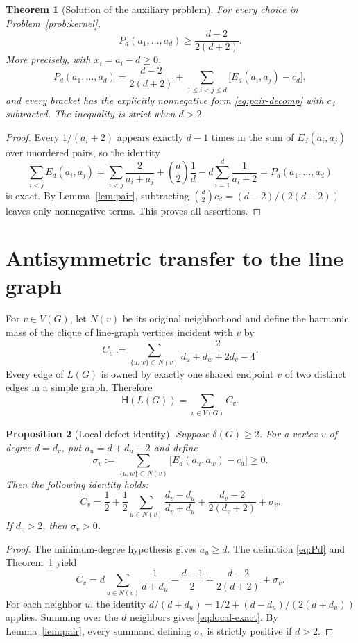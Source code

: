 \documentclass[11pt,a4paper]{article}
\newtheorem{theorem}{Theorem}[section]
\newtheorem{proposition}[theorem]{Proposition}
\theoremstyle{remark}
\newcommand{\HH}{\mathsf H}
\begin{document}
\begin{theorem}[Solution of the auxiliary problem]\label{thm:kernel}
For every choice in Problem~\ref{prob:kernel},
\begin{equation}\label{eq:Pd-bound}
 P_d(a_1,\ldots,a_d)\ge\frac{d-2}{2(d+2)}.
\end{equation}
More precisely, with $x_i=a_i-d\ge0$,
\begin{equation}\label{eq:Pd-exact}
 P_d(a_1,\ldots,a_d)=\frac{d-2}{2(d+2)}
 +\sum_{1\le i<j\le d}\bigl[E_d(a_i,a_j)-c_d\bigr],
\end{equation}
and every bracket has the explicitly nonnegative form \eqref{eq:pair-decomp} with $c_d$ subtracted. The inequality is strict when $d>2$.
\end{theorem}
\begin{proof}
Every $1/(a_i+2)$ appears exactly $d-1$ times in the sum of $E_d(a_i,a_j)$ over unordered pairs, so the identity
\[
 \sum_{i<j}E_d(a_i,a_j)=\sum_{i<j}\frac2{a_i+a_j}
 +\binom d2\frac1d-d\sum_{i=1}^d\frac1{a_i+2}=P_d(a_1,\ldots,a_d)
\]
is exact. By Lemma~\ref{lem:pair}, subtracting $\binom d2c_d=(d-2)/(2(d+2))$ leaves only nonnegative terms. This proves all assertions.
\end{proof}

\section{Antisymmetric transfer to the line graph}
For $v\in V(G)$, let $N(v)$ be its original neighborhood and define the harmonic mass of the clique of line-graph vertices incident with $v$ by
\begin{equation}\label{eq:Cv}
 C_v:=\sum_{\{u,w\}\subset N(v)}\frac2{d_u+d_w+2d_v-4}.
\end{equation}
Every edge of $L(G)$ is owned by exactly one shared endpoint $v$ of two distinct edges in a simple graph. Therefore
\begin{equation}\label{eq:sumCv}
 \HH(L(G))=\sum_{v\in V(G)}C_v.
\end{equation}

\begin{proposition}[Local defect identity]\label{prop:local}
Suppose $\delta(G)\ge2$. For a vertex $v$ of degree $d=d_v$, put $a_u=d+d_u-2$ and define
\[
 \sigma_v:=\sum_{\{u,w\}\subset N(v)}\bigl[E_d(a_u,a_w)-c_d\bigr]\ge0.
\]
Then the following identity holds:
\begin{equation}\label{eq:local-exact}
 C_v=\frac12+\frac12\sum_{u\in N(v)}\frac{d_v-d_u}{d_v+d_u}
 +\frac{d_v-2}{2(d_v+2)}+\sigma_v.
\end{equation}
If $d_v>2$, then $\sigma_v>0$.
\end{proposition}
\begin{proof}
The minimum-degree hypothesis gives $a_u\ge d$. The definition \eqref{eq:Pd} and Theorem~\ref{thm:kernel} yield
\[
 C_v=d\sum_{u\in N(v)}\frac1{d+d_u}-\frac{d-1}{2}
 +\frac{d-2}{2(d+2)}+\sigma_v.
\]
For each neighbor $u$, the identity $d/(d+d_u)=1/2+(d-d_u)/(2(d+d_u))$ applies. Summing over the $d$ neighbors gives \eqref{eq:local-exact}. By Lemma~\ref{lem:pair}, every summand defining $\sigma_v$ is strictly positive if $d>2$.
\end{proof}
\end{document}
